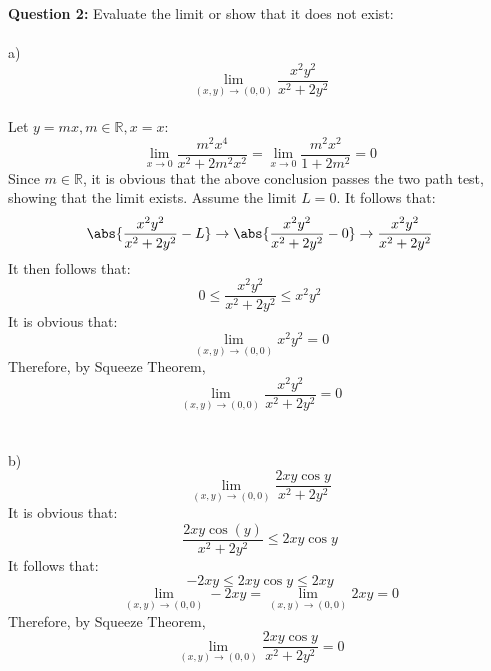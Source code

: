 \documentclass{article}
\begin{document}
\textbf{Question 2:} Evaluate the limit or show that it does not exist: \\
\\
\tab a) \[\lim_{(x,y)\to(0,0)} \frac{x^2y^2}{x^2+2y^2} \]
\\
Let $y=mx, m \in \mathbb{R}, x=x:$
\[\lim_{x\to 0} \frac{m^2x^4}{x^2+2m^2x^2} = \lim_{x\to0} \frac{m^2x^2}{1+2m^2} = 0 \]
Since $m \in \mathbb{R}$, it is obvious that the above conclusion passes the two path test, showing that the limit exists. Assume the limit $L = 0$. It follows that:
\[ \abs{\frac{x^2y^2}{x^2+2y^2}-L} \rightarrow \abs{\frac{x^2y^2}{x^2+2y^2}-0} \rightarrow \frac{x^2y^2}{x^2+2y^2} \]
It then follows that:
\[0 \leq \frac{x^2y^2}{x^2+2y^2} \leq x^2y^2 \]
It is obvious that:
\[ \lim_{(x,y)\to(0,0)} x^2y^2 = 0 \]
Therefore, by Squeeze Theorem, 
\[\lim_{(x,y)\to(0,0)} \frac{x^2y^2}{x^2+2y^2} = 0 \]
\\
\\


\tab b) \[\lim_{(x,y)\to(0,0)} \frac{2xy\cos{y}}{x^2+2y^2} \]
It is obvious that:
\[\frac{2xy\cos(y)}{x^2+2y^2} \leq 2xy\cos{y}\]
It follows that:
\[ -2xy \leq 2xy\cos{y} \leq 2xy \]
\[\lim_{(x,y)\to(0,0)} -2xy = \lim_{(x,y)\to(0,0)} 2xy = 0 \]
Therefore, by Squeeze Theorem,
\[\lim_{(x,y)\to(0,0)} \frac{2xy\cos{y}}{x^2+2y^2} = 0 \]
\end{document}
